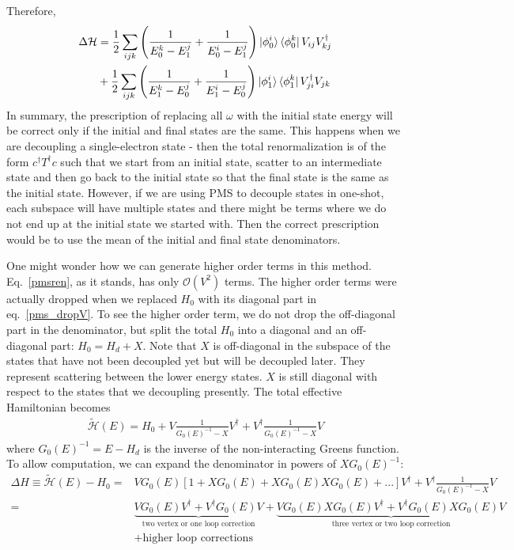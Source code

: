 Therefore,
\begin{equation}\begin{aligned}
	\label{pmsren}
	\Delta \mathcal{H} &= \frac{1}{2}\sum_{ijk}\left(\frac{1}{E_0^k - E^j_1} + \frac{1}{E_0^i - E^j_1}\right)\ket{\phi_0^i}\bra{\phi_0^k}V_{ij}V^\dagger_{kj}\\
			   &+\frac{1}{2}\sum_{ijk}\left(\frac{1}{E_1^k - E^j_0}+ \frac{1}{E_1^i - E^j_0}\right)\ket{\phi_1^i}\bra{\phi_1^k}V^\dagger_{ji}V_{jk}\\
\end{aligned}\end{equation}
In summary, the prescription of replacing all \(\omega\) with the initial state energy will be correct only if the initial and final states are the same. This happens when we are decoupling a single-electron state - then the total renormalization is of the form \(c^\dagger T^\dagger c\) such that we start from an initial state, scatter to an intermediate state and then go back to the initial state so that the final state is the same as the initial state. However, if we are using PMS to decouple states in one-shot, each subspace will have multiple states and there might be terms where we do not end up at the initial state we started with. Then the correct prescription would be to use the mean of the initial and final state denominators.

One might wonder how we can generate higher order terms in this method. Eq.~\ref{pmsren}, as it stands, has only \(\mathcal{O}(V^2)\) terms. The higher order terms were actually dropped when we replaced \(H_0\) with its diagonal part in eq.~\ref{pms_dropV}. To see the higher order term, we do not drop the off-diagonal part in the denominator, but split the total \(H_0\) into a diagonal and an off-diagonal part: \(H_0 = H_d + X\). Note that \(X\) is off-diagonal in the subspace of the states that have not been decoupled yet but will be decoupled later. They represent scattering between the lower energy states. \(X\) is still diagonal with respect to the states that we  decoupling presently. The total effective Hamiltonian becomes
\begin{equation}\begin{aligned}
	\tilde{\mathcal{H}}(E) = H_0 + V\frac{1}{G_0(E)^{-1} - X}V^\dagger +  V^\dagger\frac{1}{G_0(E)^{-1} - X}V
\end{aligned}\end{equation}
where \(G_0(E)^{-1} = E - H_d\) is the inverse of the non-interacting Greens function. To allow computation, we can expand the denominator in powers of \(XG_0(E)^{-1}\):
\begin{equation}\begin{aligned}
	\label{pms_third}
	\Delta H \equiv \tilde{\mathcal{H}}(E) - H_0 =& VG_0(E)\left[1 + XG_0(E) + XG_0(E)XG_0(E) + ...\right] V^\dagger +  V^\dagger\frac{1}{G_0(E)^{-1} - X}V\\
	=& \underbrace{V G_0(E) V^\dagger + V^\dagger G_0(E) V}_\text{two vertex or one loop correction} + \underbrace{VG_0(E)XG_0(E)V^\dagger + V^\dagger G_0(E)XG_0(E)V}_\text{three vertex or two loop correction} \\
			       &+ \text{higher loop corrections}
\end{aligned}\end{equation}
